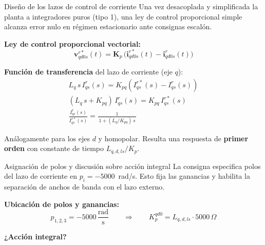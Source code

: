 \documentclass[aspectratio=169,t]{beamer}
\begin{document}
\begin{frame}{Diseño de los lazos de control de corriente}
{\small\color{uncGray}Una vez desacoplada y simplificada la planta a integradores puros (tipo 1), una ley de control proporcional simple alcanza error nulo en régimen estacionario ante consignas escalón.}\par
\vspace{3mm}

\textbf{Ley de control proporcional vectorial:}
\begin{equation*}
\bm{v}_{qd0s}^{r*}(t) = \bm{K}_p\,\big(\bm{i}_{qd0s}^{r*}(t) - \bm{i}_{qd0s}^{r}(t)\big)
\end{equation*}

\textbf{Función de transferencia} del lazo de corriente (eje $q$):
\begin{gather*}
L_q\,s\,I_{qs}^{r}(s) = K_{pq}\!\left(I_{qs}^{r*}(s) - I_{qs}^{r}(s)\right) \\[2pt]
(L_q\,s + K_{pq})\,I_{qs}^{r}(s) = K_{pq}\,I_{qs}^{r*}(s) \\[2pt]
\frac{I_{qs}^{r}(s)}{I_{qs}^{r*}(s)} = \frac{1}{\,1 + (L_q/K_{pq})\,s\,}
\end{gather*}

{\small Análogamente para los ejes $d$ y homopolar. Resulta una respuesta de \textbf{primer orden} con constante de tiempo $L_{q,d,ls}/K_p$.}
\end{frame}

\begin{frame}{Asignación de polos y discusión sobre acción integral}
{\small\color{uncGray}La consigna especifica polos del lazo de corriente en $p_i = -5000$~rad/s. Esto fija las ganancias y habilita la separación de anchos de banda con el lazo externo.}\par
\vspace{3mm}

\textbf{Ubicación de polos y ganancias:}
\begin{equation*}
p_{1,2,3} = -5000\,\frac{\text{rad}}{\text{s}}
\qquad\Rightarrow\qquad
K_p^{qd0} = L_{q,d,ls}\cdot 5000\,\Omega
\end{equation*}

\vspace{9mm}

\textbf{¿Acción integral?}

\end{frame}
\end{document}

